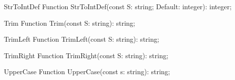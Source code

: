  
\begin{function}{StrToIntDef}
\Declaration
Function StrToIntDef(const S: string; Default: integer): integer;
\Description
\Errors
\SeeAlso
\end{function}

 
\begin{function}{Trim}
\Declaration
Function Trim(const S: string): string;
\Description
\Errors
\SeeAlso
\end{function}

 
\begin{function}{TrimLeft}
\Declaration
Function TrimLeft(const S: string): string;
\Description
\Errors
\SeeAlso
\end{function}

 
\begin{function}{TrimRight}
\Declaration
Function TrimRight(const S: string): string;
\Description
\Errors
\SeeAlso
\end{function}

 
\begin{function}{UpperCase}
\Declaration
Function UpperCase(const s: string): string;
\Description
\Errors
\SeeAlso
\end{function}

 
